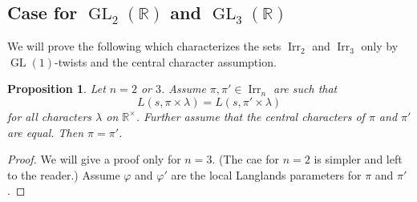 \documentclass[11pt]{amsart}
\theoremstyle{plain}
\newtheorem{Prop}[equation]{Proposition}
\theoremstyle{definition}
\numberwithin{equation}{section}
\newcommand{\R}{\mathbb{R}}
\newcommand{\la}{\lambda}
\newcommand{\Irr}{\operatorname{Irr}}
\newcommand{\GL}{\operatorname{GL}}
\begin{document}
\subsection{Case for $\GL_2(\R)$ and $\GL_3(\R)$}
We will prove the following which characterizes the sets $\Irr_2$ and
$\Irr_3$ only
by $\GL(1)$-twists and the central character assumption.
\begin{Prop}
Let $n=2$ or $3$.
Assume $\pi, \pi'\in\Irr_n$ are such that
\[
L(s, \pi\times\la)=L(s, \pi'\times\la)
\]
for all characters $\la$ on $\R^\times$. Further assume that the
central characters of $\pi$ and $\pi'$ are equal. Then $\pi=\pi'$.
\end{Prop}
\begin{proof}
We will give a proof only for
$n=3$. (The cae for $n=2$ is simpler and left to the reader.) 
Assume $\varphi$ and $\varphi'$ are the local Langlands
parameters for $\pi$ and $\pi'$.


\end{proof}
\end{document}
